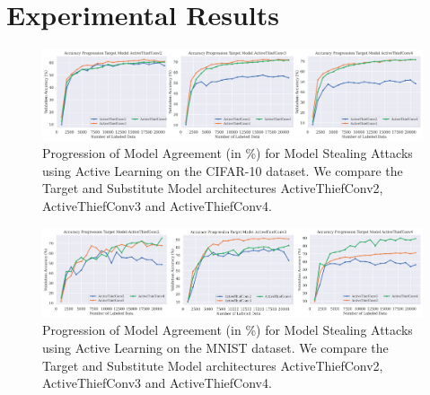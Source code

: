 \section{Experimental Results}
\label{sec:Appendix:Results}

\begin{figure}[h]
    \centering
    \includegraphics[width=\linewidth]{images/results_CALMS/cifar10_model_comp.png}
    \caption[Agreement Progression for Model Stealing on CIFAR-10 using different ActiveThief models]{Progression of Model
    Agreement (in \%) for Model Stealing Attacks using Active Learning on the CIFAR-10 dataset. We compare the Target and Substitute Model architectures
    ActiveThiefConv2, ActiveThiefConv3 and ActiveThiefConv4.}
    \label{fig:CIFAR10modelComp}
\end{figure}

\begin{figure}[h]
    \centering
    \includegraphics[width=\linewidth]{images/results_CALMS/mnist_model_comp.png}
    \caption[Agreement Progression for Model Stealing on MNIST using different ActiveThief models]{Progression of Model
    Agreement (in \%) for Model Stealing Attacks using Active Learning on the MNIST dataset. We compare the Target and Substitute Model architectures
    ActiveThiefConv2, ActiveThiefConv3 and ActiveThiefConv4.}
    \label{fig:MNISTmodelComp}
\end{figure}


